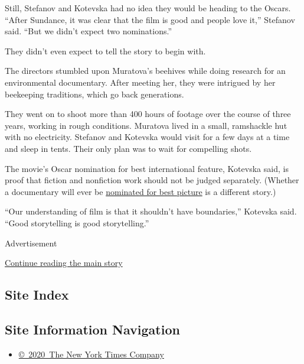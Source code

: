 Still, Stefanov and Kotevska had no idea they would be heading to the
Oscars. ``After Sundance, it was clear that the film is good and people
love it,'' Stefanov said. ``But we didn't expect two nominations.''

They didn't even expect to tell the story to begin with.

The directors stumbled upon Muratova's beehives while doing research for
an environmental documentary. After meeting her, they were intrigued by
her beekeeping traditions, which go back generations.

They went on to shoot more than 400 hours of footage over the course of
three years, working in rough conditions. Muratova lived in a small,
ramshackle hut with no electricity. Stefanov and Kotevska would visit
for a few days at a time and sleep in tents. Their only plan was to wait
for compelling shots.

The movie's Oscar nomination for best international feature, Kotevska
said, is proof that fiction and nonfiction work should not be judged
separately. (Whether a documentary will ever be
\href{https://www.indiewire.com/2020/01/honeyland-oscar-noms-documentaries-academy-awards-1202202814/}{nominated
for best picture} is a different story.)

``Our understanding of film is that it shouldn't have boundaries,''
Kotevska said. ``Good storytelling is good storytelling.''

Advertisement

\protect\hyperlink{after-bottom}{Continue reading the main story}

\hypertarget{site-index}{%
\subsection{Site Index}\label{site-index}}

\hypertarget{site-information-navigation}{%
\subsection{Site Information
Navigation}\label{site-information-navigation}}

\begin{itemize}
\tightlist
\item
  \href{https://help.nytimes.com/hc/en-us/articles/115014792127-Copyright-notice}{©~2020~The
  New York Times Company}
\end{itemize}

